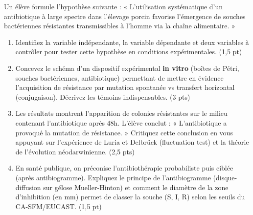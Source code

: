 \documentclass[11pt]{article}
\begin{document}
\begin{exercice}
Un élève formule l'hypothèse suivante : « L'utilisation systématique d'un antibiotique à large spectre dans l'élevage porcin favorise l'émergence de souches bactériennes résistantes transmissibles à l'homme via la chaîne alimentaire. »
\begin{enumerate}
    \item Identifiez la variable indépendante, la variable dépendante et deux variables à contrôler pour tester cette hypothèse en conditions expérimentales. (1,5 pt)
    \item Concevez le schéma d'un dispositif expérimental \textbf{in vitro} (boîtes de Pétri, souches bactériennes, antibiotique) permettant de mettre en évidence l'acquisition de résistance par mutation spontanée vs transfert horizontal (conjugaison). Décrivez les témoins indispensables. (3 pts)
    \item Les résultats montrent l'apparition de colonies résistantes sur le milieu contenant l'antibiotique après 48h. L'élève conclut : « L'antibiotique a provoqué la mutation de résistance. » Critiquez cette conclusion en vous appuyant sur l'expérience de Luria et Delbrück (fluctuation test) et la théorie de l'évolution néodarwinienne. (2,5 pts)
    \item En santé publique, on préconise l'antibiothérapie probabiliste puis ciblée (après antibiogramme). Expliquez le principe de l'antibiogramme (disque-diffusion sur gélose Mueller-Hinton) et comment le diamètre de la zone d'inhibition (en mm) permet de classer la souche (S, I, R) selon les seuils du CA-SFM/EUCAST. (1,5 pt)
\end{enumerate}
\end{exercice}
\end{document}
